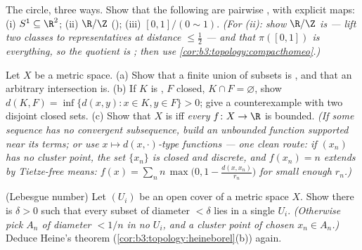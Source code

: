 \begin{exercise}[$\star\star$]\label{exo:b3:topology:5}
The circle, three ways. Show that the following are pairwise
, with explicit maps: (i) $S^1 \subseteq \R^2$;
(ii) $\R/\Z$ (); (iii) $[0,1]/(0 \sim 1)$.
\emph{(For (ii): show $\R/\Z$ is  --- lift two classes
to representatives at distance $\leq \frac12$ --- and that
$\pi([0,1])$ is everything, so the quotient is ; then use
\cref{cor:b3:topology:compacthomeo}.)}
\end{exercise}

\begin{exercise}[$\star\star$]\label{exo:b3:topology:6}
Let $X$ be a metric space.
(a) Show that a finite union of  subsets is , and
that an arbitrary intersection is.
(b) If $K$ is , $F$ closed, $K \cap F = \varnothing$,
show $d(K, F) = \inf\{d(x,y) : x \in K, y \in F\} > 0$; give a
counterexample with two disjoint closed sets.
(c) Show that $X$ is  iff \emph{every}  $f
\colon X \to \R$ is bounded. \emph{(If some sequence has no
convergent subsequence, build an unbounded  function
supported near its terms; or use $x \mapsto
d(x, \cdot)$-type functions --- one clean route: if $(x_n)$ has
no cluster point, the set $\{x_n\}$ is closed and discrete, and
$f(x_n) = n$ extends  by Tietze-free means:
$f(x) = \sum_n n\,\max\bigl(0, 1 - \frac{d(x, x_n)}{r_n}\bigr)$
for small enough $r_n$.)}
\end{exercise}

\begin{exercise}[$\star\star$]\label{exo:b3:topology:7}
(Lebesgue number) Let $(U_i)$ be an open cover of a 
metric space $X$. Show there is $\delta > 0$ such that every
subset of diameter $< \delta$ lies in a single $U_i$.
\emph{(Otherwise pick $A_n$ of diameter $< 1/n$ in no $U_i$, and
a cluster point of chosen $x_n \in A_n$.)} Deduce Heine's
theorem (\cref{cor:b3:topology:heineborel}(b)) again.
\end{exercise}

